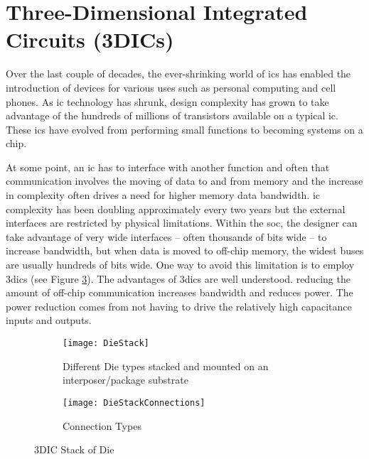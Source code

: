 

\section{Three-Dimensional Integrated Circuits (3DICs)}
\label{sec:3dic}

Over the last couple of decades, the ever-shrinking world of \acp{ic} has enabled the introduction of devices for various uses such as personal computing and cell phones.
As \ac{ic} technology has shrunk, design complexity has grown to take advantage of the hundreds of millions of transistors available on a typical \ac{ic}.
These \acp{ic} have evolved from performing small functions to becoming systems on a chip.

At some point, an \ac{ic} has to interface with another function and often that communication involves the moving of data to and from memory and the increase in complexity often drives a need for higher memory data bandwidth. 
\acf{ic} complexity has been doubling approximately every two years but the external interfaces are restricted by physical limitations.
Within the \ac{soc}, the designer can take advantage of very wide interfaces -- often thousands of bits wide -- to increase bandwidth, but when data is moved to off-chip memory, the widest buses are usually hundreds of bits wide.
One way to avoid this limitation is to employ \acp{3dic} (see Figure \ref{fig:3DIC Die}). The advantages of \acp{3dic} are well understood. reducing the amount of off-chip communication increases bandwidth and reduces power. The power reduction comes from not having to drive the relatively
high capacitance inputs and outputs.

\begin{figure}
\centering
\begin{subfigure}{.8\textwidth}
  \centering
  \texttt{[image: DieStack]}
  \captionsetup{justification=centering, skip=5pt}
  \caption{Different Die types stacked and mounted on an interposer/package substrate}
  \label{fig:Die Stack}
\end{subfigure}%

\bigskip

\begin{subfigure}{.8\textwidth}
  \centering
  \texttt{[image: DieStackConnections]}
  \captionsetup{justification=centering, skip=5pt}
  \caption{Connection Types}
  \label{fig:Die Stack Connection Types}
\end{subfigure}
\captionsetup{justification=centering, skip=12pt}
\caption[3DIC Stack of Die]{3DIC Stack of Die}
\label{fig:3DIC Die}
\end{figure}

